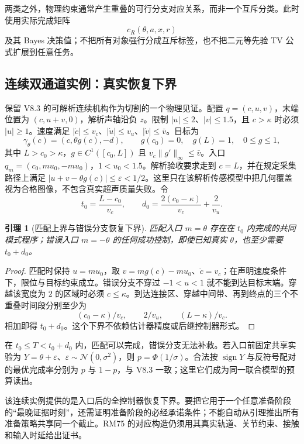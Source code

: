 \documentclass[11pt,a4paper,fontset=fandol]{ctexart}
\newtheorem{lemma}[theorem]{引理}
\theoremstyle{definition}
\theoremstyle{remark}
\numberwithin{equation}{section}
\begin{document}
两类之外，物理约束通常产生重叠的可行分支对应关系，而非一个互斥分类。此时使用实际完成矩阵
\[
 c_R(\theta,a,x,r)
\]
及其 Bayes 决策值；不把所有对象强行分成互斥标签，也不把二元等先验 TV 公式扩展到任意任务。

\subsection{连续双通道实例：真实恢复下界}
\label{sec:continuous}
保留 V8.3 的可解析连续机构作为切割的一个物理见证\cite{v83}。配置 $q=(c,u,v)$，末端位置为 $(c,u+v,0)$，解析声轴沿负 $z$。限制 $|u|\le2$、$|v|\le1.5$，且 $c>\kappa$ 时必须 $|u|\ge1$。速度满足 $|\dot c|\le v_c$、$|\dot u|\le v_u$、$|\dot v|\le\bar v$。目标为
\[
 \gamma_\theta(c)=(c,\theta g(c),-d),\qquad
 g(c_0)=0,\quad g(L)=1,\quad 0\le g\le1,
\]
其中 $L>c_0>\kappa$，$g\in C^1([c_0,L])$ 且 $v_c\|g'\|_\infty\le\bar v$。入口 $q_m=(c_0,mu_0,-mu_0)$，$1<u_0<1.5$。解析验收要求走到 $c=L$，并在规定采集路径上满足 $|u+v-\theta g(c)|\le\varepsilon<1/2$。这里只在该解析传感模型中把几何覆盖视为合格图像，不包含真实超声质量失败。令
\begin{equation}
 t_0=\frac{L-c_0}{v_c},\qquad
 d_0=\frac{2(c_0-\kappa)}{v_c}+\frac2{v_u}.
 \label{eq:continuous-times}
\end{equation}

\begin{lemma}[匹配上界与错误分支恢复下界]
\label{lem:physical}
匹配入口 $m=\theta$ 存在在 $t_0$ 内完成的共同模式程序；错误入口 $m=-\theta$ 的任何成功控制，即使已知真实 $\theta$，也至少需要 $t_0+d_0$。
\end{lemma}
\begin{proof}
匹配时保持 $u=mu_0$，取 $v=mg(c)-mu_0$、$\dot c=v_c$；在声明速度条件下，限位与目标约束成立。错误分支不穿过 $-1<u<1$ 就不能到达目标末端。穿越该宽度为 $2$ 的区域时必须 $c\le\kappa$。到达连接区、穿越中间带、再到终点的三个不重叠时间段分别至少为
\[
 (c_0-\kappa)/v_c,\qquad 2/v_u,\qquad (L-\kappa)/v_c.
\]
相加即得 $t_0+d_0$。这个下界不依赖估计器精度或后继控制器形式。
\end{proof}

在 $t_0\le T<t_0+d_0$ 内，匹配可以完成，错误分支无法补救。若入口前固定共享实验为 $Y=\theta+\varepsilon$、$\varepsilon\sim\mathcal N(0,\sigma^2)$，则 $p=\Phi(1/\sigma)$。合法按 $\operatorname{sign}Y$ 与反符号配对的最优完成率分别为 $p$ 与 $1-p$，与 V8.3 一致；这里它们成为同一联合模型的预算读出。

该连续实例提供的是入口后的全控制器恢复下界。要把它用于一个任意准备阶段的“最晚证据时刻”，还需证明准备阶段的必经承诺条件；不能自动从引理推出所有准备策略共享同一个截止。RM75 的对应构造仍须用其真实轨道、关节约束、接触和输入时延给出证书。
\end{document}
